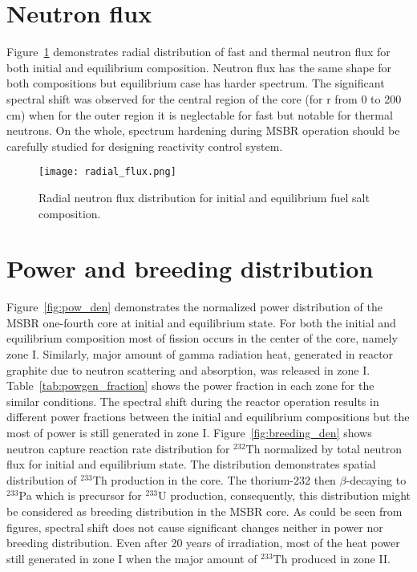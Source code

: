 \section{Neutron flux}
Figure~\ref{fig:radial_flux} demonstrates radial distribution of fast and thermal neutron flux for both initial and equilibrium composition. Neutron flux has the same shape for both compositions but equilibrium case has harder spectrum. The significant spectral shift was observed for the central region of the core (for r from 0 to 200 cm) when for the outer region it is neglectable for fast but notable for thermal neutrons. On the whole, spectrum hardening during \gls{MSBR} operation should be carefully studied for designing reactivity control system.

\begin{figure}[htp!] %
  \centering
    \vspace{-0.3em}
  \texttt{[image: radial\_flux.png]} 
  \caption{Radial neutron flux distribution for initial and equilibrium fuel salt composition.}
    \vspace{-0.6em}
  \label{fig:radial_flux}
\end{figure}
\FloatBarrier

\section{Power and breeding distribution}
Figure~\ref{fig:pow_den} demonstrates the normalized power distribution of the \gls{MSBR} one-fourth core at initial and equilibrium state.  For both the initial and equilibrium composition most of fission occurs in the center of the core, namely zone I. Similarly, major amount of gamma radiation heat, generated in reactor graphite due to neutron scattering and absorption, was released in zone I. Table~\ref{tab:powgen_fraction} shows the power fraction in each zone for the similar conditions. The spectral shift during the reactor operation results in different power fractions between the initial and equilibrium compositions but the most of power is still generated in zone I. Figure~\ref{fig:breeding_den} shows neutron capture reaction rate distribution for $^{232}$Th normalized by total neutron flux for initial and equilibrium state. The distribution demonstrates spatial distribution of $^{233}$Th production in the core. The thorium-232 then $\beta$-decaying to $^{233}$Pa which is precursor for $^{233}$U production, consequently, this distribution might be considered as breeding distribution in the \gls{MSBR} core. As could be seen from figures, spectral shift does not cause significant changes neither in power nor breeding distribution. Even after 20 years of irradiation, most of the heat power still generated in zone I when the major amount of $^{233}$Th produced in zone II.

